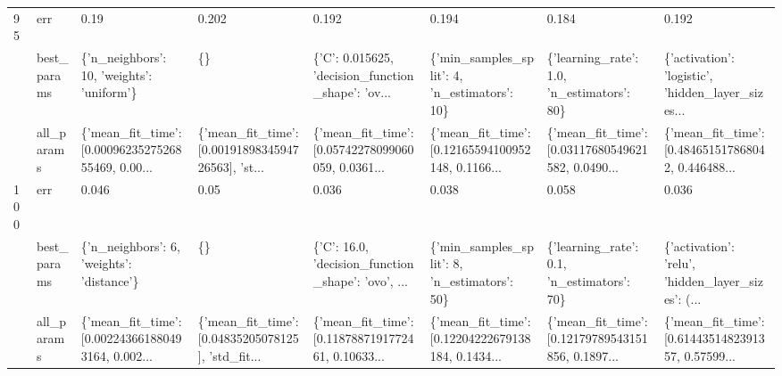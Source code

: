 \begin{tabular}{llllllll}
95  & err &                                               0.19 &                                              0.202 &                                              0.192 &                                              0.194 &                                              0.184 &                                              0.192 \\
    & best\_params &          \{'n\_neighbors': 10, 'weights': 'uniform'\} &                                                 \{\} &  \{'C': 0.015625, 'decision\_function\_shape': 'ov... &       \{'min\_samples\_split': 4, 'n\_estimators': 10\} &         \{'learning\_rate': 1.0, 'n\_estimators': 80\} &  \{'activation': 'logistic', 'hidden\_layer\_sizes... \\
    & all\_params &  \{'mean\_fit\_time': [0.0009623527526855469, 0.00... &  \{'mean\_fit\_time': [0.0019189834594726563], 'st... &  \{'mean\_fit\_time': [0.05742278099060059, 0.0361... &  \{'mean\_fit\_time': [0.12165594100952148, 0.1166... &  \{'mean\_fit\_time': [0.03117680549621582, 0.0490... &  \{'mean\_fit\_time': [0.484651517868042, 0.446488... \\
100 & err &                                              0.046 &                                               0.05 &                                              0.036 &                                              0.038 &                                              0.058 &                                              0.036 \\
    & best\_params &          \{'n\_neighbors': 6, 'weights': 'distance'\} &                                                 \{\} &  \{'C': 16.0, 'decision\_function\_shape': 'ovo', ... &       \{'min\_samples\_split': 8, 'n\_estimators': 50\} &         \{'learning\_rate': 0.1, 'n\_estimators': 70\} &  \{'activation': 'relu', 'hidden\_layer\_sizes': (... \\
    & all\_params &  \{'mean\_fit\_time': [0.002243661880493164, 0.002... &  \{'mean\_fit\_time': [0.04835205078125], 'std\_fit... &  \{'mean\_fit\_time': [0.1187887191772461, 0.10633... &  \{'mean\_fit\_time': [0.12204222679138184, 0.1434... &  \{'mean\_fit\_time': [0.12179789543151856, 0.1897... &  \{'mean\_fit\_time': [0.6144351482391357, 0.57599... \\
\bottomrule
\end{tabular}
